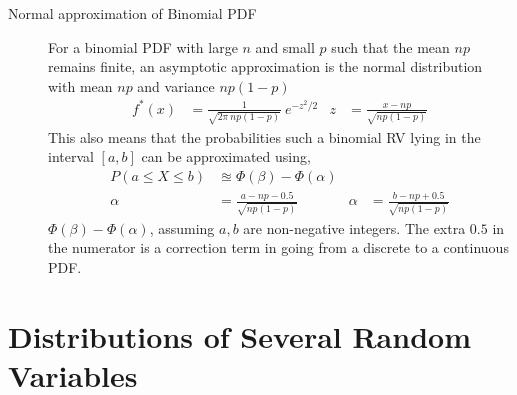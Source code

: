\begin{description}
    \item[Normal approximation of Binomial PDF] For a binomial PDF with large $ n $ and
          small $ p $ such that the mean $ np $ remains finite, an asymptotic
          approximation is the normal distribution with mean $ np $ and variance
          $ np(1-p) $
          \begin{align}
              f^*(x) & = \frac{1}{\sqrt{2\pi\ np(1-p)}}\ e^{-z^2/2} &
              z      & = \frac{x - np}{\sqrt{np(1-p)}}
          \end{align}
          This also means that the probabilities such a binomial RV lying in the interval
          $ [a,b] $ can be approximated using,
          \begin{align}
              P(a \leq X \leq b) & \approxeq \Phi(\beta) - \Phi(\alpha)   \\
              \alpha             & = \frac{a-np-0.5}{\sqrt{np(1-p)}}    &
              \alpha             & = \frac{b-np+0.5}{\sqrt{np(1-p)}}
          \end{align} $ \Phi(\beta) - \Phi(\alpha) $, assuming
          $ a, b $ are non-negative integers. The extra $ 0.5 $ in the numerator is
          a correction term in going from a discrete to a continuous PDF.
\end{description}

\section{Distributions of Several Random Variables}


